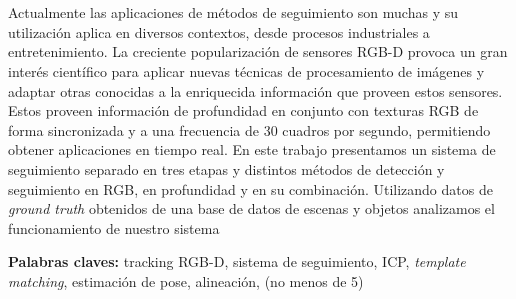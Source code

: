 \chapter*{\runtitulo}

\noindent Actualmente las aplicaciones de métodos de seguimiento son muchas y su utilización aplica en diversos contextos, desde procesos industriales a entretenimiento. La creciente popularización de sensores RGB-D provoca un gran interés científico para aplicar nuevas técnicas de procesamiento de imágenes y adaptar otras conocidas a la enriquecida información que proveen estos sensores. Estos proveen información de profundidad en conjunto con texturas RGB de forma sincronizada y a una frecuencia de 30 cuadros por segundo, permitiendo obtener aplicaciones en tiempo real. En este trabajo presentamos un sistema de seguimiento separado en tres etapas y distintos métodos de detección y seguimiento en RGB, en profundidad y en su combinación. Utilizando datos de \textit{ground truth} obtenidos de una base de datos de escenas y objetos analizamos el funcionamiento de nuestro sistema



\bigskip

\noindent\textbf{Palabras claves:} tracking RGB-D, sistema de seguimiento, ICP, \textit{template matching}, estimación de pose, alineación, (no menos de 5)
